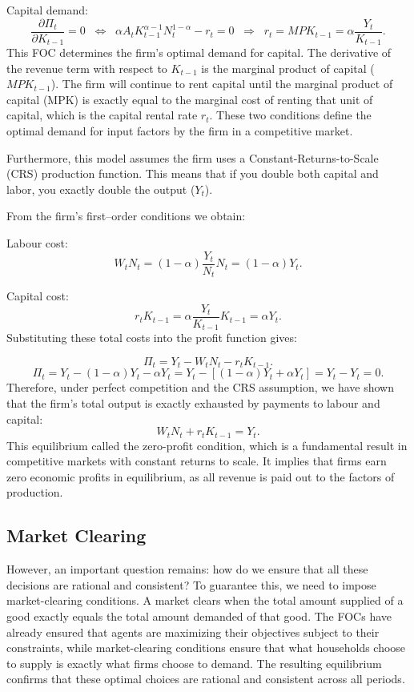 \documentclass[12pt]{article}
\begin{document}
Capital demand:
\[
\frac{\partial \Pi_t}{\partial K_{t-1}} = 0 
\;\;\Longleftrightarrow\;\;
\alpha A_t K_{t-1}^{\alpha-1} N_t^{1-\alpha} - r_t = 0
\;\;\Longrightarrow\;\;
r_t = MPK_{t-1} = \alpha \frac{Y_t}{K_{t-1}}.
\tag{15}
\]
This FOC determines the firm's optimal demand for capital. The derivative of the revenue term with respect to $K_{t-1}$ is the marginal product of capital ($MPK_{t-1}$).
The firm will continue to rent capital until the marginal product of capital (MPK) is exactly equal to the marginal cost of renting that unit of capital, which is the capital rental rate $r_t$.
These two conditions define the optimal demand for input factors by the firm in a competitive market.

Furthermore, this model assumes the firm uses a Constant-Returns-to-Scale (CRS) production function. This means that if you double both capital and labor, you exactly double the output ($Y_t$).

\noindent From the firm's first–order conditions we obtain:

\noindent Labour cost: 
\[
W_t N_t = (1-\alpha)\frac{Y_t}{N_t} N_t = (1-\alpha) Y_t.
\]

\noindent Capital cost:
\[
r_t K_{t-1} = \alpha \frac{Y_t}{K_{t-1}} K_{t-1} = \alpha Y_t.
\]
Substituting these total costs into the profit function gives:

\[
\Pi_t = Y_t - W_t N_t - r_t K_{t-1}.
\]
\[
\Pi_t 
= Y_t - (1-\alpha)Y_t - \alpha Y_t
= Y_t - \left[(1-\alpha)Y_t + \alpha Y_t\right]
= Y_t - Y_t
= 0.
\]
Therefore, under perfect competition and the CRS assumption, we have shown that the firm's total output is exactly exhausted by payments to labour and capital:
\[
W_t N_t + r_t K_{t-1} = Y_t.
\tag{16}
\]
This equilibrium called the zero-profit condition, which is a fundamental result in competitive markets with constant returns to scale. It implies that firms earn zero economic profits in equilibrium, as all revenue is paid out to the factors of production.
\subsection{Market Clearing}

\noindent
However, an important question remains: how do we ensure that all these decisions are rational and consistent? To guarantee this, we need to impose market-clearing conditions. A market clears when the total amount supplied of a good exactly equals the total amount demanded of that good. The 
FOCs have already ensured that agents are maximizing their objectives subject to their constraints, while market-clearing  conditions ensure that what households choose to supply is exactly what firms choose to demand. The resulting equilibrium confirms that these optimal choices are rational and consistent across all periods.
\end{document}
